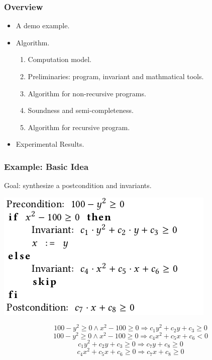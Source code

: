 \documentclass[11pt]{beamer}
\begin{document}
\begin{frame}\frametitle{Overview}

\begin{itemize}

\item A demo example.
\item Algorithm.
\begin{enumerate}

\item Computation model.
\item Preliminaries: program, invariant and mathmatical tools.
\item Algorithm for non-recursive programs.
\item Soundness and semi-completeness.
\item Algorithm for recursive program.

\end{enumerate}

\item Experimental Results.
\end{itemize}

\end{frame}


\begin{frame}\frametitle{Example: Basic Idea}
Goal: synthesize a postcondition and invariants. 
\begin{center}
\includegraphics[scale=0.4]{example1.png}
\end{center}

\[100-y^2 \ge 0 \wedge x^2 - 100\ge 0 \Rightarrow c_1y^2 + c_2y+c_3\ge 0\]
\[100-y^2 \ge 0 \wedge x^2 - 100\ge 0 \Rightarrow c_4x^2+ c_5x+c_6< 0\]
\[c_1y^2 + c_2y+c_3\ge 0\Rightarrow c_7y + c_8 \ge 0\]
\[c_4x^2+ c_5x+c_6\ge 0\Rightarrow c_7x + c_8 \ge 0\]

\end{frame}
\end{document}
